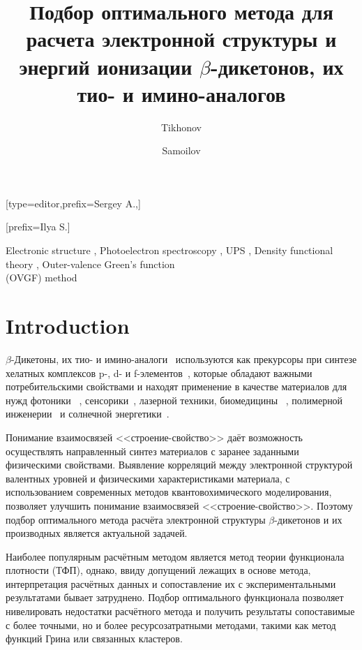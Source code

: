 \documentclass[a4paper,fleqn]{cas-dc}
\begin{document}
\let\WriteBookmarks\relax
\def\floatpagepagefraction{1}
\def\textpagefraction{.001}
\title{Подбор оптимального метода для расчета электронной структуры и энергий 
ионизации $\beta$-дикетонов, их тио- и имино-аналогов}
\author%
[1]{Tikhonov}[type=editor,prefix=Sergey A.,]
\cormark[1]
\address[1]{Russian Federation}

\author[2]{Samoilov}[prefix=Ilya S.]

\address[2]{Saint-Petersburg State University,
            Department of Photonics,
            St. Petersburg 199034,
            Russian Federation}
\begin{abstract}
\lipsum
\lipsum[3]
\end{abstract}

\begin{keywords}
Electronic structure \sep
Photoelectron spectroscopy \sep
UPS \sep
Density functional theory \sep
Outer-valence Green's function\\ (OVGF) method
\end{keywords}
\maketitle
\section{Introduction}
$\beta$-Дикетоны, их тио- и имино-аналоги~\cite{mcalduff1979photoelectron,evans1972study,joergensen1981electronic}
используются как прекурсоры при синтезе хелатных комплексов p-, d- и f-элементов~\cite{lutoshkin2021interaction},
которые обладают важными потребительскими свойствами и находят применение в качестве материалов для нужд фотоники~
\cite{zolotareva2013beta,sasabe2017unique}, сенсорики~\cite{lavis2014bright}, лазерной техники, биомедицины~
\cite{wang2021multi,lavis2008bright,klymchenko2017solvatochromic,grabowski2003structural,
kucherak2010switchable,klymchenko2014fluorescent}, полимерной инженерии~\cite{chen2014eva} и
солнечной энергетики~\cite{de1998novel}.
\par Понимание взаимосвязей <<строение-свойство>> даёт возможность осуществлять направленный синтез материалов с заранее заданными физическими свойствами. Выявление корреляций между электронной структурой валентных уровней и
 физическими характеристиками материала, с использованием современных методов квантовохимического моделирования, позволяет улучшить понимание взаимосвязей <<строение-свойство>>. Поэтому подбор оптимального метода расчёта электронной
структуры $\beta$-дикетонов и их производных является актуальной задачей.
\par Наиболее популярным расчётным методом является метод теории функционала плотности (ТФП), однако, ввиду допущений лежащих в основе метода, интерпретация расчётных данных и сопоставление их с экспериментальными результатами бывает
затруднено. Подбор оптимального функционала позволяет нивелировать недостатки расчётного метода и получить результаты сопоставимые с более точными, но и более ресурсозатратными методами, такими как метод функций Грина или связанных
кластеров.
\end{document}

